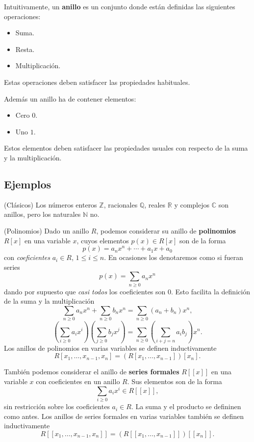 
Intuitivamente, un \textbf{anillo} es un conjunto donde están definidas
las siguientes operaciones:

\begin{itemize}
\item
  Suma.
\item
  Resta.
\item
  Multiplicación.
\end{itemize}

Estas operaciones deben satisfacer las propiedades habituales.

Además un anillo ha de contener elementos:

\begin{itemize}
\item
  Cero \(0\).
\item
  Uno \(1\).
\end{itemize}

Estos elementos deben satisfacer las propiedades usuales con respecto de
la suma y la multiplicación.

\hypertarget{ejemplos}{%
\subsection{Ejemplos}\label{ejemplos}}

\textrm{\normalfont (Clásicos)} Los números enteros
\(\mathbb Z\), racionales \(\mathbb Q\), reales \(\mathbb R\) y
complejos \(\mathbb C\) son anillos, pero los naturales \(\mathbb N\)
no. 

\textrm{\normalfont (Polinomios)} Dado un anillo \(R\),
podemos considerar su anillo de \textbf{polinomios} \(R[x]\) en una
variable \(x\), cuyos elementos \(p(x)\in R[x]\) son de la forma
\[p(x)=a_nx^n+\cdots+a_1x+a_0\] con \emph{coeficientes} \(a_i\in R\),
\(1\leq i\leq n\). En ocasiones los denotaremos como si fueran series
\[p(x)=\sum_{n\geq 0}a_nx^n\] dando por supuesto que \emph{casi todos}
los coeficientes son \(0\). Esto facilita la definición de la suma y la
multiplicación
\[\sum_{n\geq 0}a_nx^n+\sum_{n\geq 0}b_nx^n=\sum_{n\geq 0}(a_n+b_n)x^n,\]
\[\left(\sum_{i\geq 0}a_ix^i\right)\left(\sum_{j\geq 0}b_jx^j\right)=\sum_{n\geq 0}\left(\sum_{i+j=n}a_ib_j\right)x^n.\]
Los anillos de polinomios en varias variables se definen inductivamente
\[R[x_1,\dots, x_{n-1},x_n]=(R[x_1,\dots, x_{n-1}])[x_n].\]


También podemos considerar el anillo de \textbf{series formales}
\(R[[x]]\) en una variable \(x\) con coeficientes en un anillo \(R\).
Sus elementos son de la forma \[\sum_{i\geq 0}a_ix^i\in R[[x]],\] sin
restricción sobre los coeficientes \(a_i\in R\). La suma y el producto
se defininen como antes. Los anillos de series formales en varias
variables también se definen inductivamente
\[R[[x_1,\dots, x_{n-1},x_n]]=(R[[x_1,\dots, x_{n-1}]])[[x_n]].\]


